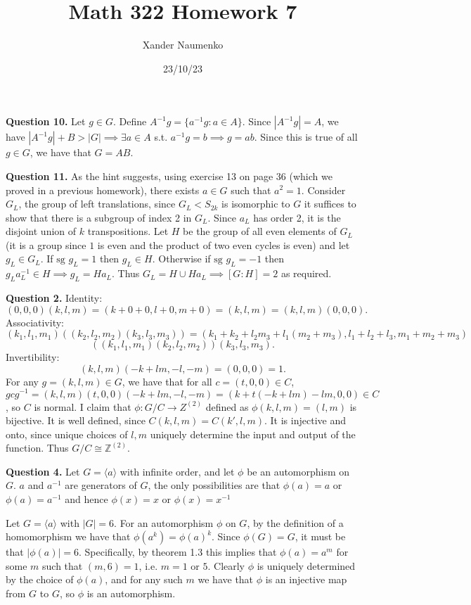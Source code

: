 \documentclass[letterpaper, reqno,11pt]{article}
\begin{document}
\title{Math 322 Homework 7}
\date{23/10/23}
\author{Xander Naumenko}
\maketitle

{\medskip\noindent\bf Question 10.} Let $g\in G$. Define $A^{-1}g=\{a^{-1}g: a\in A\}$. Since $|A^{-1}g|=A$, we have $\left| A^{-1}g \right| +B>|G|\implies \exists a\in A$ s.t. $a^{-1}g=b\implies g=ab$. Since this is true of all $g\in G$, we have that $G=AB$.

{\medskip\noindent\bf Question 11.} As the hint suggests, using exercise 13 on page 36 (which we proved in a previous homework), there exists $a\in G$ such that $a^2=1$. Consider $G_L$, the group of left translations, since $G_L<S_{2k}$ is isomorphic to $G$ it suffices to show that there is a subgroup of index 2 in $G_L$. Since $a_L$ has order 2, it is the disjoint union of $k$ transpositions. Let $H$ be the group of all even elements of $G_L$ (it is a group since $1$ is even and the product of two even cycles is even) and let $g_L\in G_L$. If $\text{sg }g_L=1$ then $g_L\in H$. Otherwise if $\text{sg }g_L=-1$ then $g_La_L^{-1}\in H\implies g_L=Ha_L$. Thus $G_L=H\cup Ha_L\implies [G:H]=2$ as required.

{\medskip\noindent\bf Question 2.} Identity:
\[
    (0,0,0)(k,l,m)=(k+0+0,l+0,m+0)=(k,l,m)=(k,l,m)(0,0,0)
.\]
Associativity:
\[
    (k_1,l_1,m_1)\left( (k_2,l_2,m_2)(k_3,l_3,m_3) \right) =(k_1+k_2+l_2m_3+l_1(m_2+m_3), l_1+l_2+l_3,m_1+m_2+m_3)
\]
\[
\left((k_1,l_1,m_1) (k_2,l_2,m_2)\right)(k_3,l_3,m_3)
.\]
Invertibility:
\[
    (k,l,m)(-k+lm,-l,-m)=\left( 0,0,0 \right) =1
.\]
For any $g=(k,l,m)\in G$, we have that for all $c=(t,0,0)\in C$, $gcg^{-1}=(k,l,m)(t,0,0)(-k+lm,-l,-m)=\left( k+t\left( -k+lm \right)-lm,0,0  \right) \in C$, so $C$ is normal. I claim that $\phi:G/C\to Z^{(2)}$ defined as $\phi(k,l,m)=(l,m)$ is bijective. It is well defined, since $C(k,l,m)=C(k',l,m)$. It is injective and onto, since unique choices of $l,m$ uniquely determine the input and output of the function. Thus $G/C\cong \mathbb{Z}^{(2)}$.

{\medskip\noindent\bf Question 4.} Let $G=\langle a\rangle$ with infinite order, and let $\phi$ be an automorphism on $G$. $a$ and $a^{-1}$ are generators of $G$, the only possibilities are that $\phi(a)=a$ or $\phi(a)=a^{-1}$ and hence $\phi(x)=x$ or $\phi(x)=x^{-1}$

Let $G=\langle a\rangle$ with $|G|=6$. For an automorphism $\phi$ on $G$, by the definition of a homomorphism we have that $\phi(a^{k})=\phi(a)^{k}$. Since $\phi(G)=G$, it must be that $|\phi(a)|=6$. Specifically, by theorem 1.3 this implies that $\phi(a)=a^{m}$ for some $m$ such that $(m,6)=1$, i.e. $m=1$ or $5$. Clearly $\phi$ is uniquely determined by the choice of $\phi(a)$, and for any such $m$ we have that $\phi$ is an injective map from $G$ to $G$, so $\phi$ is an automorphism.
\end{document}
